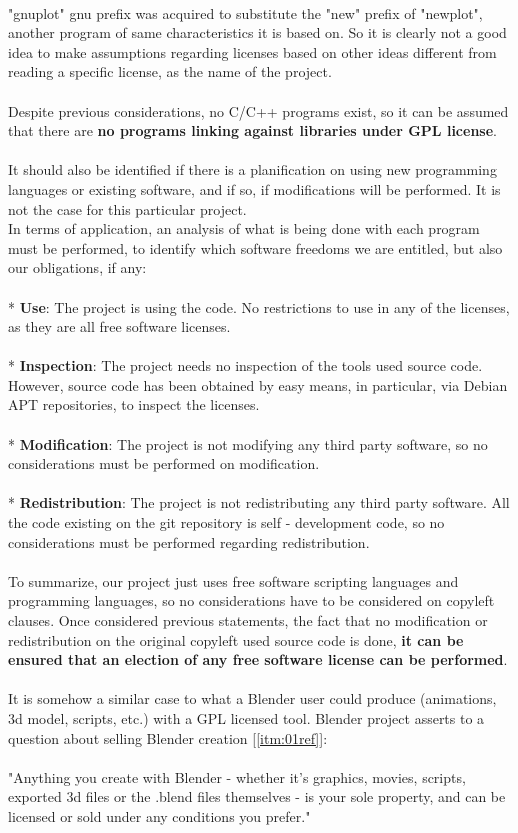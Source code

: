 \documentclass[11pt]{article}
\begin{document}
\\
"gnuplot" gnu prefix was acquired to substitute the "new" prefix of "newplot", another program of same characteristics it is based on. So it is clearly not a good idea to make assumptions regarding licenses based on other ideas different from reading a specific license, as the name of the project.\\
\\
Despite previous considerations, no C/C++ programs exist, so it can be assumed that there are \textbf{no programs linking against libraries under GPL license}.\\
\\
It should also be identified if there is a planification on using new programming languages or existing software, and if so, if modifications will be performed. It is not the case for this particular project.\\
In terms of application, an analysis of what is being done with each program must be performed, to identify which software freedoms we are entitled, but also our obligations, if any:\\
\\
* \textbf{Use}: The project is using the code. No restrictions to use in any of the licenses, as they are all free software licenses.\\
\\
* \textbf{Inspection}: The project needs no inspection of the tools used source code. However, source code has been obtained by easy means, in particular, via Debian APT repositories, to inspect the licenses.\\
\\
* \textbf{Modification}: The project is not modifying any third party software, so no considerations must be performed on modification.\\
\\
* \textbf{Redistribution}: The project is not redistributing any third party software. All the code existing on the git repository is self - development code, so no considerations must be performed regarding redistribution.\\
\\
To summarize, our project just uses free software scripting languages and programming languages, so no considerations have to be considered on copyleft clauses.
Once considered previous statements, the fact that no modification or redistribution on the original copyleft used source code is done, \textbf{it can be ensured that an election of any free software license can be performed}.\\
\\
It is somehow a similar case to what a Blender user could produce (animations, 3d model, scripts, etc.) with a GPL licensed tool.
Blender project asserts to a question about selling Blender creation [\ref{itm:01ref}]:\\
\\
"Anything you create with Blender - whether it's graphics, movies, scripts, exported 3d files or the .blend files themselves - is your sole property, and can be licensed or sold under any conditions you prefer."
\end{document}
